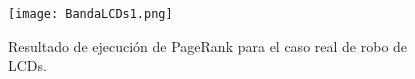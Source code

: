 \begin{figure}
	\centering
	\texttt{[image: BandaLCDs1.png]}
	\caption{Resultado de ejecución de PageRank para el caso real de robo de LCDs.} 
	\label{fig:BandaLCDs1}
\end{figure}





